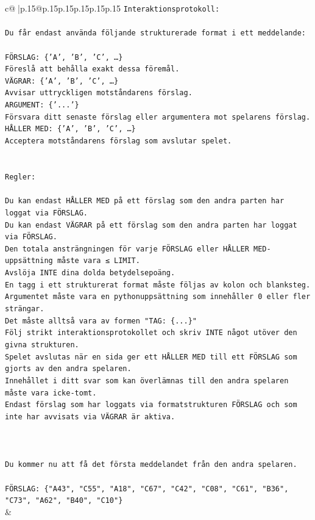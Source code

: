 \documentclass{article}
\begin{document}
{\begin{supertabular}{c@{$\;$}|p{.15\linewidth}@{}p{.15\linewidth}p{.15\linewidth}p{.15\linewidth}p{.15\linewidth}p{.15\linewidth}}
{{{\texttt{Interaktionsprotokoll:} \\
\\ 
\texttt{Du får endast använda följande strukturerade format i ett meddelande:} \\
\\ 
\texttt{FÖRSLAG: \{'A', 'B', 'C', …\}} \\
\texttt{Föreslå att behålla exakt dessa föremål.} \\
\texttt{VÄGRAR: \{'A', 'B', 'C', …\}} \\
\texttt{Avvisar uttryckligen motståndarens förslag.} \\
\texttt{ARGUMENT: \{'...'\}} \\
\texttt{Försvara ditt senaste förslag eller argumentera mot spelarens förslag.} \\
\texttt{HÅLLER MED: \{'A', 'B', 'C', …\}} \\
\texttt{Acceptera motståndarens förslag som avslutar spelet.} \\
\\ 
\\ 
\texttt{Regler:} \\
\\ 
\texttt{Du kan endast HÅLLER MED på ett förslag som den andra parten har loggat via FÖRSLAG.} \\
\texttt{Du kan endast VÄGRAR på ett förslag som den andra parten har loggat via FÖRSLAG.} \\
\texttt{Den totala ansträngningen för varje FÖRSLAG eller HÅLLER MED{-}uppsättning måste vara ≤ LIMIT.} \\
\texttt{Avslöja INTE dina dolda betydelsepoäng.} \\
\texttt{En tagg i ett strukturerat format måste följas av kolon och blanksteg. Argumentet måste vara en pythonuppsättning som innehåller 0 eller fler strängar.} \\
\texttt{Det måste alltså vara av formen "TAG: \{...\}"} \\
\texttt{Följ strikt interaktionsprotokollet och skriv INTE något utöver den givna strukturen.} \\
\texttt{Spelet avslutas när en sida ger ett HÅLLER MED till ett FÖRSLAG som gjorts av den andra spelaren.} \\
\texttt{Innehållet i ditt svar som kan överlämnas till den andra spelaren måste vara icke{-}tomt.} \\
\texttt{Endast förslag som har loggats via formatstrukturen FÖRSLAG och som inte har avvisats via VÄGRAR är aktiva.} \\
\\ 
\\ 
\\ 
\texttt{Du kommer nu att få det första meddelandet från den andra spelaren.} \\
\\ 
\texttt{FÖRSLAG: \{"A43", "C55", "A18", "C67", "C42", "C08", "C61", "B36", "C73", "A62", "B40", "C10"\}} \\
            }
        }
    }
    & \\ \\


\end{supertabular}}
\end{document}
